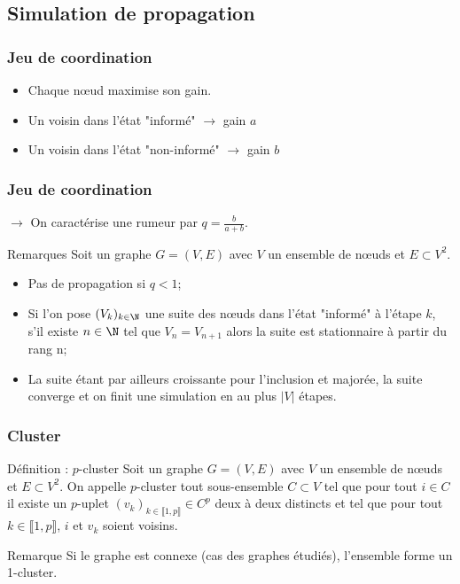 \documentclass{beamer}
\begin{document}
\subsection{Simulation de propagation}
\begin{frame}
  \frametitle{Jeu de coordination}
  \begin{itemize}
    \item<2-> Chaque nœud maximise son gain.
    \item<3-> Un voisin dans l'état "informé" $\rightarrow$ gain $a$
    \item<3-> Un voisin dans l'état "non-informé" $\rightarrow$ gain $b$
  \end{itemize}

\end{frame}

\begin{frame}
  \frametitle{Jeu de coordination}
  $\rightarrow$ On caractérise une rumeur par $q = \frac{b}{a+b}$.
  \begin{block}{Remarques}
    Soit un graphe $G = (V, E)$ avec $V$ un ensemble de nœuds et $E \subset V^2$.
    \begin{itemize}
      \item<1-> Pas de propagation si $q<1$;
      \item<2-> Si l'on pose $(V_k)_{k\in\N}$ une suite des nœuds dans l'état "informé" à l'étape $k$, s'il existe $n\in\N$ tel que $V_n = V_{n+1}$ alors la suite est stationnaire à partir du rang n;
      \item<3-> La suite étant par ailleurs croissante pour l'inclusion et majorée, la suite converge et on finit une simulation en au plus $|V|$ étapes.
    \end{itemize}
  \end{block}
\end{frame}

\begin{frame}
  \frametitle{Cluster}
  \begin{block}{Définition : $p$-cluster}
    Soit un graphe $G = (V, E)$ avec $V$ un ensemble de nœuds et $E \subset V^2$. On appelle $p$-cluster tout sous-ensemble $C \subset V$ tel que pour tout $i\in C$ il existe un $p$-uplet $(v_k)_{k\in \llbracket1,p\rrbracket} \in C^p$ deux à deux distincts et tel que pour tout $k\in \llbracket1,p\rrbracket$, $i$ et $v_k$ soient voisins.
  \end{block}
  \begin{block}{Remarque}
    Si le graphe est connexe (cas des graphes étudiés), l'ensemble forme un 1-cluster.
  \end{block}
\end{frame}
\end{document}
